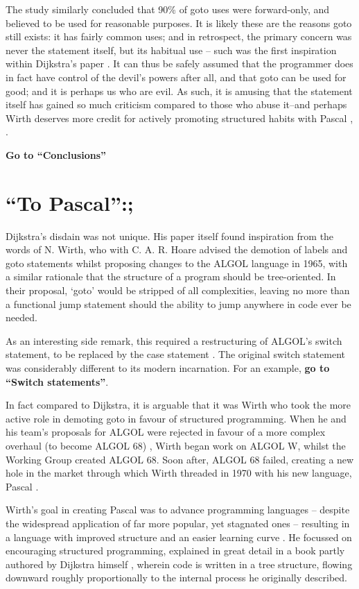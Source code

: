 \documentclass{journal}
\begin{document}
The study similarly concluded that 90\% of goto uses were forward-only, and believed to be used for reasonable purposes. It is likely these are the reasons goto still exists: it has fairly common uses; and in retrospect, the primary concern was never the statement itself, but its habitual use -- such was the first inspiration within Dijkstra's paper \cite{goto}. It can thus be safely assumed that the programmer does in fact have control of the devil's powers after all, and that goto can be used for good; and it is perhaps us who are evil. As such, it is amusing that the statement itself has gained so much criticism compared to those who abuse it--and perhaps Wirth deserves more credit for actively promoting structured habits with Pascal \cite{pascal}, \cite{pascalrecollections}.

\textbf{Go to ``Conclusions''}

\setcounter{section}{1}
\section{``To Pascal'':;}
Dijkstra's disdain was not unique. His paper itself found inspiration from the words of N. Wirth, who with C. A. R. Hoare \cite{algolwirth} advised the demotion of labels and goto statements whilst proposing changes to the ALGOL language in 1965, with a similar rationale that the structure of a program should be tree-oriented. In their proposal, `goto' would be stripped of all complexities, leaving no more than a functional jump statement should the ability to jump anywhere in code ever be needed.

As an interesting side remark, this required a restructuring of ALGOL's switch statement, to be replaced by the case statement \cite{algolwirth}. The original switch statement was considerably different to its modern incarnation. For an example, \textbf{go to ``Switch statements''}.

In fact compared to Dijkstra, it is arguable that it was Wirth who took the more active role in demoting goto in favour of structured programming. When he and his team's proposals for ALGOL were rejected in favour of a more complex overhaul (to become ALGOL 68) \cite{pascalrecollections}, Wirth began work on ALGOL W, whilst the Working Group created ALGOL 68. Soon after, ALGOL 68 failed, creating a new hole in the market through which Wirth threaded in 1970 with his new language, Pascal \cite{pascalrecollections}.

Wirth's goal in creating Pascal was to advance programming languages -- despite the widespread application of far more popular, yet stagnated ones -- resulting in a language with improved structure and an easier learning curve \cite{pascal}. He focussed on encouraging structured programming, explained in great detail in a book partly authored by Dijkstra himself \cite{structured}, wherein code is written in a tree structure, flowing downward roughly proportionally to the internal process he originally \cite{goto} described.
\end{document}

